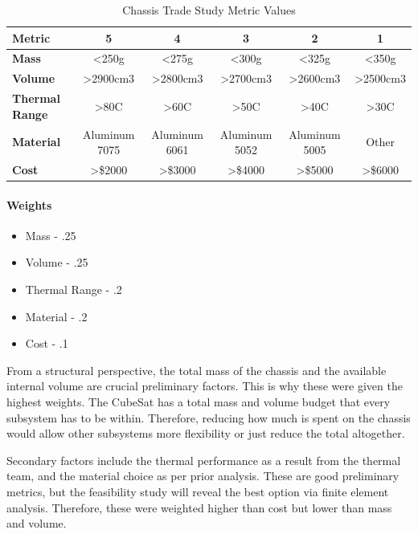 \begin{table}[H]
\centering
\begin{tabular}{|l|c|c|c|c|c|} 
\hline
    \textbf{Metric} & \textbf{5} & \textbf{4} & \textbf{3} & \textbf{2} & \textbf{1}
    \\
\hline
    \textbf{Mass} & <250g & <275g & <300g & <325g & <350g
    \\
\hline
    \textbf{Volume} & >2900cm3 & >2800cm3 & >2700cm3 & >2600cm3 & >2500cm3
    \\
\hline
    \textbf{Thermal Range} & >80C & >60C & >50C & >40C & >30C
    \\
\hline
    \textbf{Material} & Aluminum 7075 & Aluminum 6061 & Aluminum 5052 & Aluminum 5005 & Other
    \\
\hline
    \textbf{Cost} & >\$2000 & >\$3000 & >\$4000 & >\$5000 & >\$6000
    \\

\hline
\end{tabular}
\caption{Chassis Trade Study Metric Values}
\label{tbl:chassis_Metric_Scores}
\end{table}

\paragraph{Weights}
\begin{itemize}
    \item Mass - .25
    \item Volume - .25
    \item Thermal Range - .2
    \item Material - .2
    \item Cost - .1
\end{itemize}

From a structural perspective, the total mass of the chassis and the available internal volume are crucial preliminary factors. This is why these were given the highest weights. The CubeSat has a total mass and volume budget that every subsystem has to be within. Therefore, reducing how much is spent on the chassis would allow other subsystems more flexibility or just reduce the total altogether. 

Secondary factors include the thermal performance as a result from the thermal team, and the material choice as per prior analysis. These are good preliminary metrics, but the feasibility study will reveal the best option via finite element analysis. Therefore, these were weighted higher than cost but lower than mass and volume.

